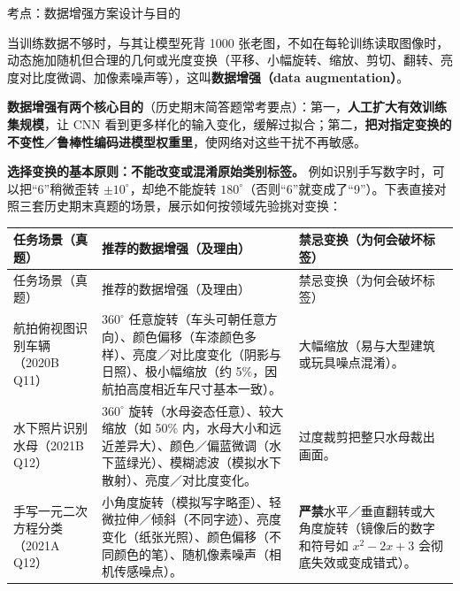 
考点：数据增强方案设计与目的 

当训练数据不够时，与其让模型死背 1000 张老图，不如在每轮训练读取图像时，动态施加随机但合理的几何或光度变换（平移、小幅旋转、缩放、剪切、翻转、亮度对比度微调、加像素噪声等），这叫\textbf{数据增强（data augmentation）}。

\textbf{数据增强有两个核心目的}（历史期末简答题常考要点）：第一，\textbf{人工扩大有效训练集规模}，让 CNN 看到更多样化的输入变化，缓解过拟合；第二，\textbf{把对指定变换的不变性／鲁棒性编码进模型权重里}，使网络对这些干扰不再敏感。

\textbf{选择变换的基本原则：不能改变或混淆原始类别标签。} 例如识别手写数字时，可以把“6”稍微歪转 $\pm 10^\circ$，却绝不能旋转 $180^\circ$（否则“6”就变成了“9”）。下表直接对照三套历史期末真题的场景，展示如何按领域先验挑对变换：

\begingroup\small\setlength{\tabcolsep}{3pt}\renewcommand{\arraystretch}{1.22}
\begin{longtable}{@{}>{\raggedright\arraybackslash}p{}>{\raggedright\arraybackslash}p{}>{\raggedright\arraybackslash}p{}@{}}
\toprule
任务场景（真题） & 推荐的数据增强（及理由） & 禁忌变换（为何会破坏标签） \\
\midrule\endfirsthead
任务场景（真题） & 推荐的数据增强（及理由） & 禁忌变换（为何会破坏标签） \\
\midrule\endhead
\bottomrule\endfoot
航拍俯视图识别车辆（2020B Q11） & $360^\circ$ 任意旋转（车头可朝任意方向）、颜色偏移（车漆颜色多样）、亮度／对比度变化（阴影与日照）、极小幅缩放（约 5\%，因航拍高度相近车尺寸基本一致）。 & 大幅缩放（易与大型建筑或玩具噪点混淆）。 \\
水下照片识别水母（2021B Q12） & $360^\circ$ 旋转（水母姿态任意）、较大缩放（如 50\% 内，水母大小和远近差异大）、颜色／偏蓝微调（水下蓝绿光）、模糊滤波（模拟水下散射）、亮度／对比度变化。 & 过度裁剪把整只水母裁出画面。 \\
手写一元二次方程分类（2021A Q12） & 小角度旋转（模拟写字略歪）、轻微拉伸／倾斜（不同字迹）、亮度变化（纸张光照）、颜色偏移（不同颜色的笔）、随机像素噪声（相机传感噪点）。 & \textbf{严禁}水平／垂直翻转或大角度旋转（镜像后的数字和符号如 $x^2-2x+3$ 会彻底失效或变成错式）。 \\
\end{longtable}\endgroup

